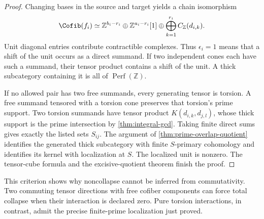 \begin{proof}
Changing bases in the source and target yields a chain isomorphism
\[
 \Cofib(f_i)\simeq
 \mathbb Z^{b_i-r_i}\oplus\mathbb Z^{a_i-r_i}[1]
 \oplus\bigoplus_{k=1}^{r_i}C_{\mathbb Z}(d_{i,k}).
\]
Unit diagonal entries contribute contractible complexes. Thus $\epsilon_i=1$ means that a shift of the unit occurs as a direct summand. If two independent cones each have such a summand, their tensor product contains a shift of the unit. A thick subcategory containing it is all of $\operatorname{Perf}(\mathbb Z)$.

If no allowed pair has two free summands, every generating tensor is torsion. A free summand tensored with a torsion cone preserves that torsion's prime support. Two torsion summands have tensor product $K(d_{i,k},d_{j,l})$, whose thick support is the prime intersection by \cref{thm:integral-gcd}. Taking finite direct sums gives exactly the listed sets $S_{ij}$. The argument of \cref{thm:prime-overlap-quotient} identifies the generated thick subcategory with finite $S$-primary cohomology and identifies its kernel with localization at $S$. The localized unit is nonzero. The tensor-cube formula and the excisive-quotient theorem finish the proof.
\end{proof}

This criterion shows why noncollapse cannot be inferred from commutativity. Two commuting tensor directions with free cofiber components can force total collapse when their interaction is declared zero. Pure torsion interactions, in contrast, admit the precise finite-prime localization just proved.

